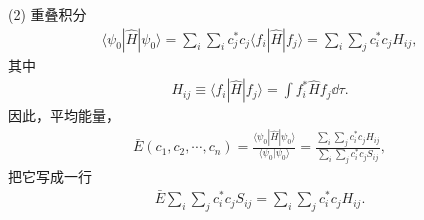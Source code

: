 
(2) 重叠积分
\begin{align}
    \langle \psi_0 | \hat H | \psi_0 \rangle = 
    \sum_i \sum_i c_j^* c_j \langle f_i | \hat H | f_j \rangle = \sum_i \sum_j c_i^* c_j H_{ij},
\end{align}
其中
\begin{align}
    H_{ij} \equiv \langle f_i | \hat H | f_j \rangle = \int f_i^* \hat H f_j \dd\tau. 
\end{align}
因此，平均能量，
\begin{align}
    \bar E(c_1, c_2, \cdots, c_n) = \frac{\langle \psi_0 | \hat H | \psi_0 \rangle}{\langle \psi_0 | \psi_0 \rangle} = \frac{\sum_i \sum_j c_i^* c_j H_{ij}}{\sum_i \sum_j c_i^* c_j S_{ij}},
\end{align}
把它写成一行
\begin{align}
    \bar E \sum_i \sum_j c_i^* c_j S_{ij} = \sum_i \sum_j c_i^* c_j H_{ij}. 
\end{align}


